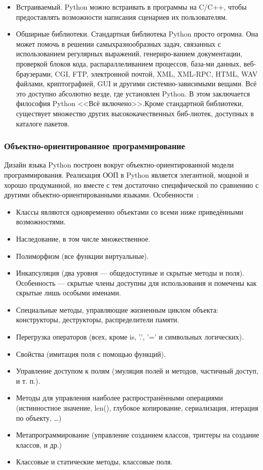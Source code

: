 \begin{itemize}
  \item Встраиваемый. Python можно встраивать в программы на C/C++, чтобы предоставлять возможности написания сценариев их пользователям.
  \item Обширные библиотеки. Стандартная библиотека Python просто огромна. Она может помочь в решении самыхразнообразных задач, связанных с использованием регулярных выражений, генериро-ванием документации, проверкой блоков кода, распараллеливанием процессов, база-ми данных, веб-браузерами, CGI, FTP, электронной почтой, XML, XML-RPC, HTML, WAV файлами, криптографией, GUI и другими системно-зависимыми вещами. Всё это доступно абсолютно везде, где установлен Python. В этом заключается философия Python <<Всё включено>>.Кроме стандартной библиотеки, существует множество других высококачественных биб-лиотек, доступных в каталоге пакетов.
\end{itemize}

\subsubsection{Объектно-ориентированное программирование}
Дизайн языка Python построен вокруг объектно-ориентированной модели программирования. Реализация ООП в Python является элегантной, мощной и хорошо продуманной, но вместе с тем достаточно специфической по сравнению с другими объектно-ориентированными языками. Особенности~\cite{wiki_python, byte_of_python}:
\begin{itemize}
\item Классы являются одновременно объектами со всеми ниже приведёнными возможностями.
\item Наследование, в том числе множественное.
\item Полиморфизм (все функции виртуальные).
\item Инкапсуляция (два уровня — общедоступные и скрытые методы и поля). Особенность — скрытые члены доступны для использования и помечены как скрытые лишь особыми именами.
\item Специальные методы, управляющие жизненным циклом объекта: конструкторы, деструкторы, распределители памяти.
\item Перегрузка операторов (всех, кроме is, '.', '=' и символьных логических).
\item Свойства (имитация поля с помощью функций).
\item Управление доступом к полям (эмуляция полей и методов, частичный доступ, и т. п.).
\item Методы для управления наиболее распространёнными операциями (истинностное значение, len(), глубокое копирование, сериализация, итерация по объекту, …)
\item Метапрограммирование (управление созданием классов, триггеры на создание классов, и др.)
\item Классовые и статические методы, классовые поля.
\end{itemize}

